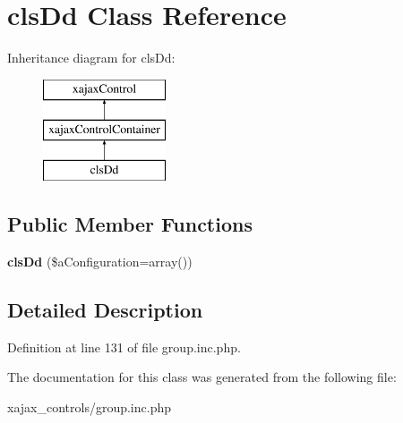 \hypertarget{classclsDd}{
\section{clsDd Class Reference}
\label{classclsDd}
}
Inheritance diagram for clsDd:\begin{figure}[H]
\begin{center}
\leavevmode
\includegraphics[height=3.000000cm]{classclsDd}
\end{center}
\end{figure}
\subsection*{Public Member Functions}
\begin{DoxyCompactItemize}
\item 
\hypertarget{classclsDd_a6bcc55f409decbcfbf29c28af982a9e9}{
{\bfseries clsDd} (\$aConfiguration=array())}
\label{classclsDd_a6bcc55f409decbcfbf29c28af982a9e9}

\end{DoxyCompactItemize}


\subsection{Detailed Description}


Definition at line 131 of file group.inc.php.



The documentation for this class was generated from the following file:\begin{DoxyCompactItemize}
\item 
xajax\_\-controls/group.inc.php\end{DoxyCompactItemize}
